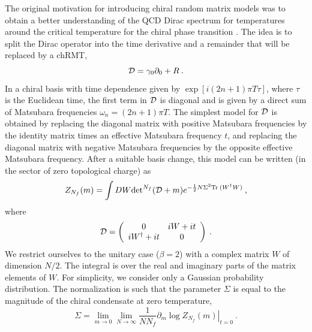 The original motivation for introducing chiral random matrix models
was to obtain a better understanding of the QCD Dirac spectrum for
temperatures around the critical temperature for the chiral phase
transition \cite{JV,tilot}. The idea is to split the Dirac operator
into the time derivative and a remainder that will be replaced by a
chRMT,
\begin{equation} 
  {\cal D} = \gamma_0 \partial_0 + R\:.  
\end{equation} 
In a chiral basis with time dependence given by $\exp [i(2n+1)\pi
T\tau]$, where $\tau$ is the Euclidean time, the first term in ${\cal
  D}$ is diagonal and is given by a direct sum of Matsubara
frequencies $\omega_n = (2n+1)\pi T$. The simplest model for ${\cal
  D}$ is obtained by replacing the diagonal matrix with positive
Matsubara frequencies by the identity matrix times an effective
Matsubara frequency $t$, and replacing the diagonal matrix with negative
Matsubara frequencies by the opposite effective Matsubara frequency.
After a suitable basis change, this model can be written (in the sector
of zero topological charge) as \cite{JV,tilot}
\begin{equation} 
  Z_{N_f}(m) = \int DW {\det}^{N_f}({\cal D}+m) 
  e^{-\frac12 N\Sigma^2 {\rm Tr\:} (W^\dagger W)}\:,
  \label{zrandomt}
\end{equation}
where
\begin{equation}
  {\cal D} = \left (\begin{array}{cc} 0 & iW +it\\
      iW^\dagger +it& 0 \end{array} \right )\:.
  \label{diracop}
\end{equation}
We restrict ourselves to the unitary case ($\beta =2$) with a complex
matrix $W$ of dimension $N/2$.  The integral is over the real and
imaginary parts of the matrix elements of $W$.  For simplicity, we 
consider only a Gaussian probability distribution.  The normalization is
such that the parameter $\Sigma$ is equal to the magnitude of the
chiral condensate at zero temperature,
\begin{equation}
  \Sigma=\lim_{m\to0}\lim_{N\to\infty}\frac 1{NN_f} 
  \partial_m \left.\log Z_{N_f}(m) \right|_{t=0}\:.
\end{equation}

